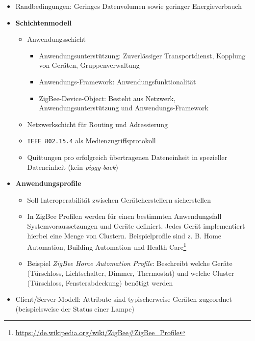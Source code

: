 \begin{itemize}
\begin{itemize}
		\item Randbedingungen: Geringes Datenvolumen sowie geringer Energieverbauch
		\item \textbf{Schichtenmodell}
		\begin{itemize}
			\item Anwendungsschicht
			\begin{itemize}
				\item Anwendungsunterstützung: Zuverlässiger Transportdienst, Kopplung von Geräten, Gruppenverwaltung
				\item Anwendungs-Framework: Anwendungsfunktionalität
				\item ZigBee-Device-Object: Besteht aus Netzwerk, Anwendungsunterstützung und Anwendungs-Framework
			\end{itemize}
			\item Netzwerkschicht für Routing und Adressierung
			\item \texttt{IEEE 802.15.4} als Medienzugriffsprotokoll
			\item Quittungen pro erfolgreich übertragenen Dateneinheit in spezieller Dateneinheit (kein \textit{piggy-back})
		\end{itemize}
		\item \textbf{Anwendungsprofile}
		\begin{itemize}
			\item Soll Interoperabilität zwischen Geräteherstellern sicherstellen
			\item In ZigBee Profilen werden für einen bestimmten Anwendungsfall Systemvoraussetzungen und Geräte definiert. Jedes Gerät implementiert hierbei eine Menge von Clustern. Beispielprofile sind z. B. Home Automation, Building Automation und Health Care\footnote{\url{https://de.wikipedia.org/wiki/ZigBee\#ZigBee_Profile}}
			\item Beispiel \textit{ZigBee Home Automation Profile}: Beschreibt welche Geräte (Türschloss, Lichtschalter, Dimmer, Thermostat) und welche Cluster (Türschloss, Fensterabdeckung) benötigt werden
		\end{itemize}
		\item Client/Server-Modell: Attribute sind typischerweise Geräten zugeordnet (beispielsweise der Status einer Lampe)

\end{itemize}
\end{itemize}
